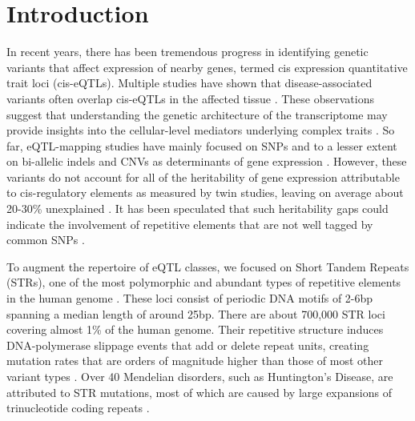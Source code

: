 \section{Introduction}
In recent years, there has been tremendous progress in identifying genetic variants that affect expression of nearby genes, termed cis expression quantitative trait loci (cis-eQTLs). Multiple studies have shown that disease-associated variants often overlap cis-eQTLs in the affected tissue \cite{MoffattKabeschLiangEtAl2007,BarrettHansoulNicolaeEtAl2008,ArdlieDelucaSegreEtAl2015}. These observations suggest that understanding the genetic architecture of the transcriptome may provide insights into the cellular-level mediators underlying complex traits \cite{NicaMontgomeryDimasEtAl2010,NicolaeGamazonZhangEtAl2010,WardKellis2012}. So far, eQTL-mapping studies have mainly focused on SNPs and to a lesser extent on bi-allelic indels and CNVs as determinants of gene expression \cite{StrangerForrestDunningEtAl2007,GrundbergSmallHedmanEtAl2012,LappalainenSammethFriedlanderEtAl2013}. However, these variants do not account for all of the heritability of gene expression attributable to cis-regulatory elements as measured by twin studies, leaving on average about 20-30\% unexplained \cite{GrundbergSmallHedmanEtAl2012,WrightSullivanBrooksEtAl2014}.  It has been speculated that such heritability gaps could indicate the involvement of repetitive elements that are not well tagged by common SNPs \cite{ManolioCollinsCoxEtAl2009,PressCarlsonQueitsch2014}. 

To augment the repertoire of eQTL classes, we focused on Short Tandem Repeats (STRs), one of the most polymorphic and abundant types of repetitive elements in the human genome \cite{Ellegren2004,GemayelVincesLegendreEtAl2010}. These loci consist of periodic DNA motifs of 2-6bp spanning a median length of around 25bp. There are about 700,000 STR loci covering almost 1\% of the human genome. Their repetitive structure induces DNA-polymerase slippage events that add or delete repeat units, creating mutation rates that are orders of magnitude higher than those of most other variant types \cite{WeberWong1993,Ellegren2004}. Over 40 Mendelian disorders, such as Huntington's Disease, are attributed to STR mutations, most of which are caused by large expansions of trinucleotide coding repeats \cite{Mirkin2007}. 

